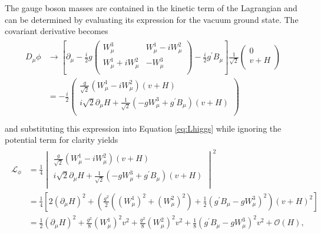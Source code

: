 The gauge boson masses are contained in the kinetic term of the Lagrangian and can be determined by evaluating its expression for the vacuum ground state. The covariant derivative becomes
\begin{align}
  \begin{split}
    D_{\mu}\phi &\rightarrow \left[ \partial_{\mu} - \frac{i}{2}g \begin{pmatrix} W_{\mu}^{3} & W_{\mu}^{1} - iW_{\mu}^{2} \\ W_{\mu}^{1} + iW_{\mu}^{2} & -W_{\mu}^{3} \\ \end{pmatrix} - \frac{i}{2}g^{\prime}B_{\mu} \right] \frac{1}{\sqrt{2}} \begin{pmatrix} 0 \\ v + H \\ \end{pmatrix} \\[1em]
                &= -\frac{i}{2} \begin{pmatrix} \frac{g}{\sqrt{2}}(W_{\mu}^{1}-iW_{\mu}^{2})(v + H) \\ i\sqrt{2}\partial_{\mu}H + \frac{1}{\sqrt{2}}(-gW_{\mu}^{3} + g^{\prime}B_{\mu})(v + H) \\ \end{pmatrix} \\
  \end{split}
\end{align}
and substituting this expression into Equation \ref{eq:Lhiggs} while ignoring the potential term for clarity yields
\begin{align}
  \begin{split}
    \mathcal{L}_{\phi} &= \frac{1}{4} \begin{vmatrix} \frac{g}{\sqrt{2}}(W_{\mu}^{1}-iW_{\mu}^{2})(v + H) \\ i\sqrt{2}\partial_{\mu}H + \frac{1}{\sqrt{2}}(-gW_{\mu}^{3} + g^{\prime}B_{\mu})(v + H) \\ \end{vmatrix}^{2} \\[1em]
                       &= \frac{1}{4} \left[ 2(\partial_{\mu}H)^{2} + \left( \frac{g^{2}}{2} \left( (W_{\mu}^{1})^{2} + (W_{\mu}^{2})^{2} \right) + \frac{1}{2} \left( g^{\prime}B_{\mu} - gW_{\mu}^{3} \right)^{2} \right) (v + H)^{2} \right] \\[1em]
                       &= \frac{1}{2}(\partial_{\mu}H)^{2} + \frac{g^{2}}{8}(W_{\mu}^{1})^{2}v^{2} + \frac{g^{2}}{8}(W_{\mu}^{2})^{2}v^{2} + \frac{1}{8}\left( g^{\prime}B_{\mu} - gW_{\mu}^{3} \right)^{2}v^{2} + \mathcal{O}(H), \\
    \label{eq:gaugemasses}
  \end{split}
\end{align}
